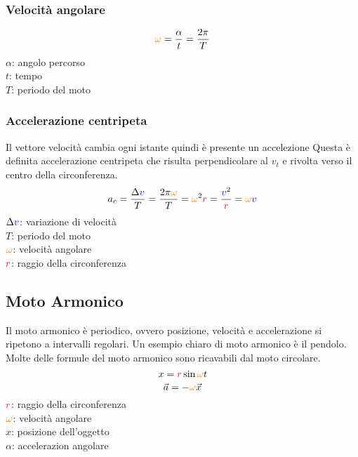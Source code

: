 \subsubsection{Velocità angolare}
\begin{equation*}
\mathcolor{orange}{\omega} = \frac{\alpha}{t} = \frac{2\pi}{T}
\end{equation*}
$\alpha$: angolo percorso\\ 
$t$: tempo\\
$T$: periodo del moto

\subsubsection{Accelerazione centripeta}
Il vettore velocità cambia ogni istante quindi è presente un accelezione Questa è definita 
accelerazione centripeta che risulta perpendicolare al $v_t$ e rivolta verso il centro della 
circonferenza.
\begin{equation*}
a_c = \frac{\Delta \mathcolor{blue}{v}}{T} = \frac{2\pi\mathcolor{orange}{\omega}}{T} = 
\mathcolor{orange}{\omega}^2\mathcolor{red}{r} = \frac{\mathcolor{blue}{v}^2}{\mathcolor{red}{r}} = 
\mathcolor{orange}{\omega}\mathcolor{blue}{v}
\end{equation*}
$\Delta\mathcolor{blue}{v}$: variazione di velocità\\
$T$: periodo del moto\\
$\mathcolor{orange}{\omega}$: velocità angolare\\
$\mathcolor{red}{r}$: raggio della circonferenza

\subsection{Moto Armonico}
Il moto armonico è periodico, ovvero posizione, velocità e accelerazione si ripetono a intervalli 
regolari. Un esempio chiaro di moto armonico è il pendolo.\\
Molte delle formule del moto armonico sono ricavabili dal moto circolare.
\begin{equation*}
x = \mathcolor{red}{r}\sin\mathcolor{orange}{\omega}t
\end{equation*}
\begin{equation*}
\vec{a} = -\mathcolor{orange}{\omega}\vec{x}
\end{equation*}
$\mathcolor{red}{r}$: raggio della circonferenza\\
$\mathcolor{orange}{\omega}$: velocità angolare\\
$x$: posizione dell'oggetto\\
$\alpha$: accelerazion angolare

